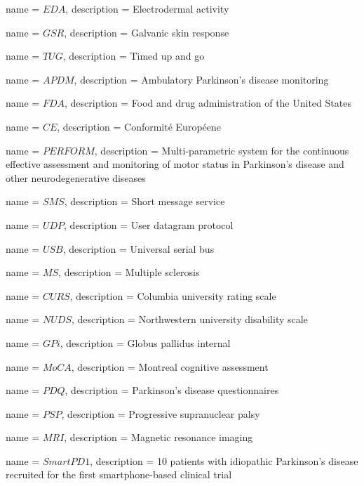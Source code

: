 {
	name = $EDA$, 
	description = Electrodermal activity
}

{
	name = $GSR$, 
	description = Galvanic skin response
}

{
	name = $TUG$, 
	description = Timed up and go
}

{
	name = $APDM$, 
	description = Ambulatory Parkinson's disease monitoring
}

{
	name = $FDA$, 
	description = Food and drug administration of the United States
}

{
	name = $CE$, 
	description = Conformité Européene
}

{
	name = $PERFORM$, 
	description = Multi-parametric system for the continuous effective assessment and monitoring of motor status in Parkinson's disease and other neurodegenerative diseases
}

{
	name = $SMS$, 
	description = Short message service
}

{
	name = $UDP$, 
	description = User datagram protocol
}

{
	name = $USB$, 
	description = Universal serial bus
}

{
	name = $MS$, 
	description = Multiple sclerosis
}

{
	name = $CURS$, 
	description = Columbia university rating scale
}

{
	name = $NUDS$, 
	description = Northwestern university disability scale
}

{
	name = $GPi$, 
	description = Globus pallidus internal
}

{
	name = $MoCA$, 
	description = Montreal cognitive assessment
}

{
	name = $PDQ$, 
	description = Parkinson's disease questionnaires
}

{
	name = $PSP$, 
	description = Progressive supranuclear palsy
}

{
	name = $MRI$, 
	description = Magnetic resonance imaging
}

{
	name = $SmartPD1$, 
	description = 10 patients with idiopathic Parkinson's disease recruited for the first smartphone-based clinical trial
}

